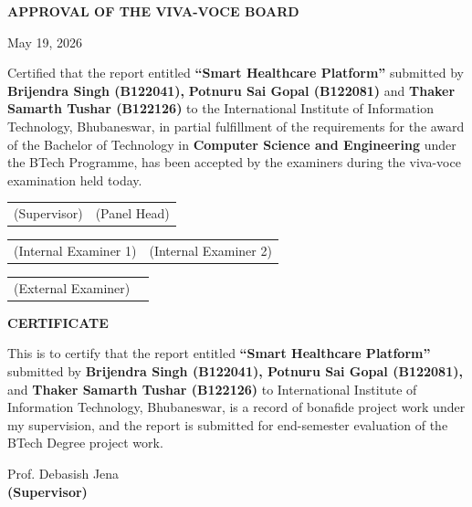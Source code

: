\documentclass[a4paper,12pt]{report}
\begin{document}
\newpage
\vspace*{2cm}
\begin{center}
    \textbf{\Large APPROVAL OF THE VIVA-VOCE BOARD}
\end{center}
\vspace{1cm}
\begin{flushright}
    May 19, 2026
\end{flushright}
\vspace{1cm}
\justifying
Certified that the report entitled \textbf{``Smart Healthcare Platform''} submitted by \textbf{Brijendra Singh (B122041),} \textbf{Potnuru Sai Gopal (B122081)} and \textbf{Thaker Samarth Tushar (B122126)} to the {International Institute of Information Technology, Bhubaneswar}, in partial fulfillment of the requirements for the award of the Bachelor of Technology in \textbf{Computer Science and Engineering} under the BTech Programme, has been accepted by the examiners during the viva-voce examination held today.
\vspace{1.5cm}
\begin{center}

\renewcommand{\arraystretch}{2.2}
\begin{tabular}{p{} p{}}
 (Supervisor) & (Panel Head) \\[1cm]
\end{tabular}

\begin{tabular}{p{} p{}}
 (Internal Examiner 1) & (Internal Examiner 2) \\[1cm]
\end{tabular}

\begin{tabular}{p{} p{}}
(External Examiner)
\end{tabular}
\end{center}
\vfill

\clearpage

\vspace*{2cm}
\begin{center}
    \textbf{\Large CERTIFICATE}
\end{center}
\vspace{1cm}
This is to certify that the report entitled \textbf{``Smart Healthcare Platform''} submitted by \textbf{Brijendra Singh (B122041), Potnuru Sai Gopal (B122081),} and \textbf{Thaker Samarth Tushar (B122126)} to International Institute of Information Technology, Bhubaneswar, is a record of bonafide project work under my supervision, and the report is submitted for end-semester evaluation of the BTech Degree project work.
\vspace{1.5cm}
\begin{flushleft}
    {Prof. Debasish Jena} \\
    \textbf{(Supervisor)}
\end{flushleft}
\end{document}
